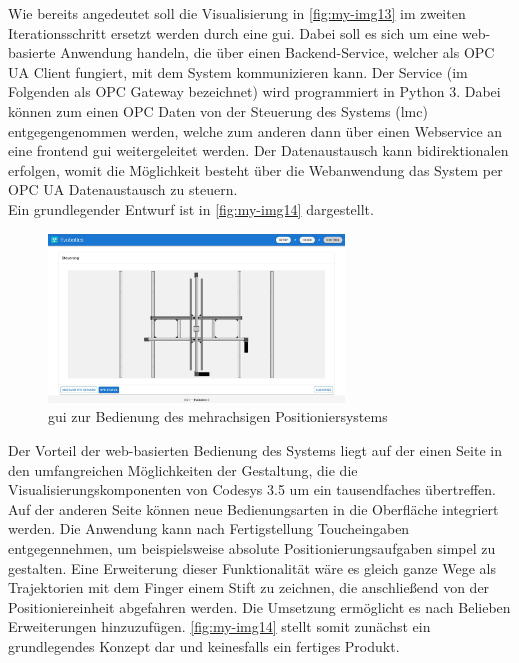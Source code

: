 \documentclass[../../../Bachelorarbeit.tex]{subfiles}
\begin{document}
Wie bereits angedeutet soll die Visualisierung in \autoref{fig:my-img13} im zweiten Iterationsschritt ersetzt werden durch eine \acs{gui}. Dabei soll es sich um eine web-basierte Anwendung handeln, die über einen Backend-Service, welcher als OPC UA Client fungiert, mit dem System kommunizieren kann. Der Service (im Folgenden als OPC Gateway bezeichnet) wird programmiert in Python 3. Dabei können zum einen OPC Daten von der Steuerung des Systems (\acs{lmc}) entgegengenommen werden, welche zum anderen dann über einen Webservice an eine frontend \acs{gui} weitergeleitet werden. Der Datenaustausch kann bidirektionalen erfolgen, womit die Möglichkeit besteht über die Webanwendung das System per OPC UA Datenaustausch zu steuern. \\
Ein grundlegender Entwurf ist in \autoref{fig:my-img14} dargestellt.

\begin{figure}[H]
    \centering
    \includegraphics[width=0.7\textwidth]{Images/GUI.jpg}
    \caption[\acs{gui} zur Bedienung]{\acs{gui} zur Bedienung des mehrachsigen Positioniersystems}
    \label{fig:my-img14}
\end{figure}

Der Vorteil der web-basierten Bedienung des Systems liegt auf der einen Seite in den umfangreichen Möglichkeiten der Gestaltung, die die Visualisierungskomponenten von Codesys 3.5 um ein tausendfaches übertreffen. Auf der anderen Seite können neue Bedienungsarten in die Oberfläche integriert werden. Die Anwendung kann nach Fertigstellung Toucheingaben entgegennehmen, um beispielsweise absolute Positionierungsaufgaben simpel zu gestalten. Eine Erweiterung dieser Funktionalität wäre es gleich ganze Wege als Trajektorien mit dem Finger \bzw einem Stift zu zeichnen, die anschließend von der Positioniereinheit abgefahren werden. Die Umsetzung ermöglicht es nach Belieben Erweiterungen hinzuzufügen. \autoref{fig:my-img14} stellt somit zunächst ein grundlegendes Konzept dar und keinesfalls ein fertiges Produkt.
\end{document}
